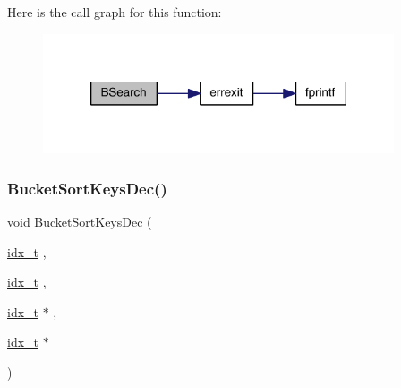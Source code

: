 Here is the call graph for this function\+:\nopagebreak
\begin{figure}[H]
\begin{center}
\leavevmode
\includegraphics[width=294pt]{a00951_a3a1a8277026ab6b77f95bd7e0c02a41f_cgraph}
\end{center}
\end{figure}
\mbox{\label{a00951_abc5284e2afdf3ad4be669709c4a404c7}} 
\subsubsection{\texorpdfstring{Bucket\+Sort\+Keys\+Dec()}{BucketSortKeysDec()}}
{\footnotesize\ttfamily void Bucket\+Sort\+Keys\+Dec (\begin{DoxyParamCaption}\item[{\hyperlink{a00876_aaa5262be3e700770163401acb0150f52}{idx\+\_\+t}}]{,  }\item[{\hyperlink{a00876_aaa5262be3e700770163401acb0150f52}{idx\+\_\+t}}]{,  }\item[{\hyperlink{a00876_aaa5262be3e700770163401acb0150f52}{idx\+\_\+t} $\ast$}]{,  }\item[{\hyperlink{a00876_aaa5262be3e700770163401acb0150f52}{idx\+\_\+t} $\ast$}]{ }\end{DoxyParamCaption})}

\mbox{\label{a00951_ac072b75124ecf7bb80f7c902d2605928}} 
